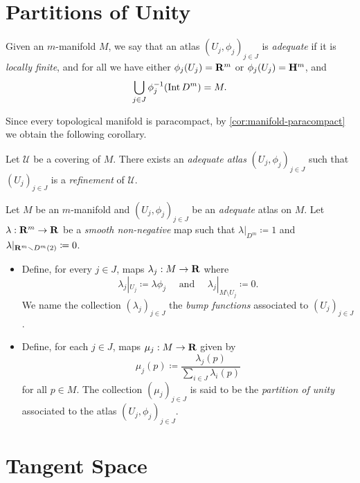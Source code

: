 \section{Partitions of Unity}

\begin{definition}
\label{def:adequate-atlas}
Given an \(m\)-manifold \(M\), we say that an atlas
\((U_j, \phi_j)_{j \in J}\) is \emph{adequate} if it is \emph{locally
  finite}, and for all we have either \(\phi_j(U_j) = \mathbf{R}^m\) or
\(\phi_j(U_j) = \mathbf{H}^m\), and
\[
\bigcup_{j \in J} \phi_j^{-1}(\operatorname{Int} D^m) = M.
\]
\end{definition}

Since every topological manifold is paracompact, by
\cref{cor:manifold-paracompact} we obtain the following corollary.

\begin{corollary}
\label{cor:refinement-adequate-atlas}
Let \(\mathcal{U}\) be a covering of \(M\). There exists an \emph{adequate
  atlas} \((U_j, \phi_j)_{j \in J}\) such that \((U_j)_{j \in J}\) is
a \emph{refinement} of \(\mathcal{U}\).
\end{corollary}

\begin{definition}
\label{def:}
Let \(M\) be an \(m\)-manifold and \((U_{j}, \phi_j)_{j \in J}\) be an
\emph{adequate} atlas on \(M\). Let \(\lambda: \mathbf{R}^m \to \mathbf{R}\) be a \emph{smooth
  non-negative} map such that \(\lambda|_{D^m} \coloneq 1\) and
\(\lambda|_{\mathbf{R}^m \smallsetminus D^m(2)} \coloneq 0\).
\begin{itemize}\setlength\itemsep{0em}
\item Define, for every \(j \in J\), maps \(\lambda_j: M \to \mathbf{R}\) where
  \[
  \lambda_j|_{U_j} \coloneq \lambda \phi_j
  \quad\text{ and }\quad
  \lambda_j|_{M \setminus U_j} \coloneq 0.
  \]
  We name the collection \((\lambda_j)_{j \in J}\) the \emph{bump functions}
  associated to \((U_j)_{j \in J}\).
\item Define, for each \(j \in J\), maps \(\mu_j: M \to \mathbf{R}\) given by
  \[
  \mu_j(p) \coloneq \frac{\lambda_j(p)}{\sum_{i \in J} \lambda_i(p)}
  \]
  for all \(p \in M\). The collection \((\mu_j)_{j \in J}\) is said to be the
  \emph{partition of unity} associated to the atlas \((U_j, \phi_j)_{j \in J}\).
\end{itemize}
\end{definition}

\section{Tangent Space}

